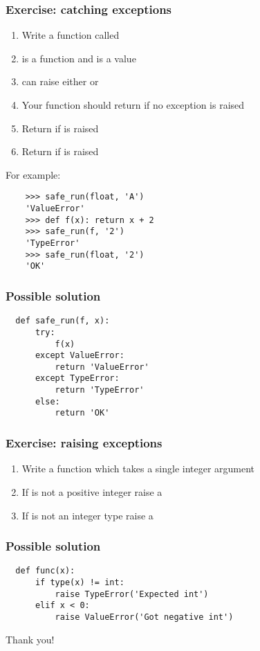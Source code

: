 \documentclass[14pt,compress]{beamer}
\begin{document}
\begin{frame}
  \frametitle{Exercise: catching exceptions}
  \small
  \begin{enumerate}
  \item Write a function called 
  \item {} is a function and  is a value
  \item {} can raise either  or 
  \item Your function should return  if no exception is raised
  \item Return  if  is raised
  \item Return  if  is raised
  \end{enumerate}
  For example:
  \begin{lstlisting}
    >>> safe_run(float, 'A')
    'ValueError'
    >>> def f(x): return x + 2
    >>> safe_run(f, '2')
    'TypeError'
    >>> safe_run(float, '2')
    'OK'
  \end{lstlisting}

\end{frame}

\begin{frame}
\frametitle{Possible solution}
\begin{lstlisting}
  def safe_run(f, x):
      try:
          f(x)
      except ValueError:
          return 'ValueError'
      except TypeError:
          return 'TypeError'
      else:
          return 'OK'

 \end{lstlisting}
\end{frame}

\begin{frame}
  \frametitle{Exercise: raising exceptions}
  \begin{enumerate}
  \item Write a function  which takes a single integer argument
  \item If  is not a positive integer raise a 
  \item If  is not an integer type raise a 
  \end{enumerate}
\end{frame}

\begin{frame}
  \frametitle{Possible solution}
  \small
\begin{lstlisting}
  def func(x):
      if type(x) != int:
          raise TypeError('Expected int')
      elif x < 0:
          raise ValueError('Got negative int')

\end{lstlisting}
\end{frame}

\begin{frame}
  \centering
  \Huge

  Thank you!
\end{frame}
\end{document}
